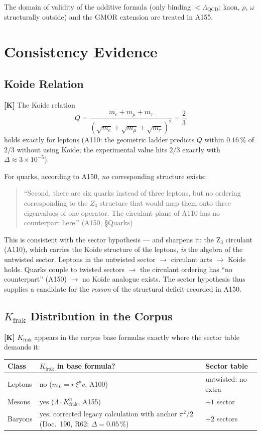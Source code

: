 The domain of validity of the additive formula (only binding
$< \Lambda_\text{QCD}$; kaon, $\rho$, $\omega$ structurally outside)
and the GMOR extension are treated in A155.

\section{Consistency Evidence}

\subsection{Koide Relation}

\textbf{[K]} The Koide relation
\[
  Q = \frac{m_e+m_\mu+m_\tau}{(\sqrt{m_e}+\sqrt{m_\mu}+\sqrt{m_\tau})^2}
  = \frac{2}{3}
\]
holds exactly for leptons (A110: the geometric ladder predicts $Q$
within $0{.}16\,\%$ of $2/3$ without using Koide; the experimental
value hits $2/3$ exactly with $\Delta \approx 3\times10^{-5}$).

For quarks, according to A150, \emph{no} corresponding structure
exists:
\begin{quote}\small
``Second, there are six quarks instead of three leptons, but no
ordering corresponding to the $Z_3$ structure that would map them onto
three eigenvalues of one operator. The circulant plane of A110 has no
counterpart here.'' (A150, \S{}Quarks)
\end{quote}

This is consistent with the sector hypothesis --- and sharpens it: the
Z$_3$ circulant (A110), which carries the Koide structure of the
leptons, \emph{is} the algebra of the untwisted sector. Leptons in the
untwisted sector $\to$ circulant acts $\to$ Koide holds. Quarks couple
to twisted sectors $\to$ the circulant ordering has ``no counterpart''
(A150) $\to$ no Koide analogue exists. The sector hypothesis thus
supplies a candidate for the \emph{reason} of the structural deficit
recorded in A150.

\subsection{$K_\text{frak}$ Distribution in the Corpus}

\textbf{[K]} $K_\text{frak}$ appears in the corpus base formulas
exactly where the sector table demands it:

\begin{center}
\renewcommand{\arraystretch}{1.3}
{\small\begin{tabular}{lll}
\toprule
Class & $K_\text{frak}$ in base formula? & Sector table \\
\midrule
Leptons & no ($m_L = r\,\xi^{p}v$, A100) & untwisted: no extra \\
Mesons & yes ($\Lambda\cdot K_\text{frak}^{n}$, A155) & $+1$ sector \\
Baryons & yes; corrected legacy calculation with anchor $\pi^2/2$ (Doc.~190, R62; $\Delta=0{.}05\,\%$) & $+2$ sectors \\
\bottomrule
\end{tabular}}
\renewcommand{\arraystretch}{1.0}
\end{center}

